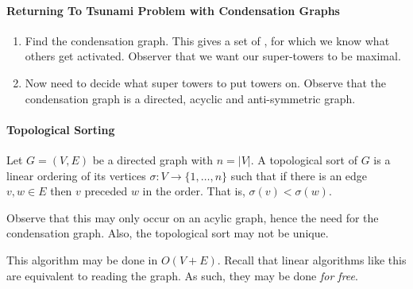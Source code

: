 \paragraph{Returning To Tsunami Problem with Condensation Graphs}
\begin{enumerate}
    \item Find the condensation graph.
        This gives a set of , for which we know what
        others get activated. Observer that we want our super-towers to
        be maximal.
    \item Now need to decide what super towers to put towers on.
        Observe that the condensation graph is a directed, acyclic and
        anti-symmetric graph.
\end{enumerate}

\paragraph{Topological Sorting}
Let \(G = (V, E)\) be a directed graph with \(n = |V|\).
A topological sort of \(G\) is a linear ordering of its vertices
\(\sigma: V \to  \{1, \ldots, n\} \) such that if there is an edge
\(v, w \in  E\) then \(v\) preceded \( w \) in the order. That is,
\( \sigma(v) < \sigma(w)\).

Observe that this may only occur on an acylic graph, hence the need for
the condensation graph. Also, the topological sort may not be unique.

This algorithm may be done in \(O\left( V + E \right) \).
Recall that linear algorithms like this are equivalent to reading the graph. 
As such, they may be done \textit{for free}.


